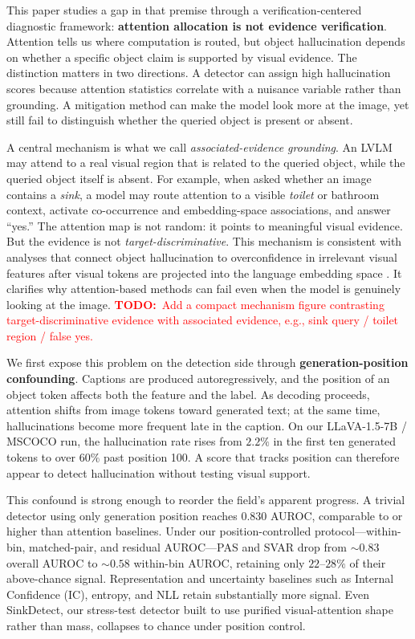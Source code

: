 \documentclass[letterpaper]{article} \usepackage[submission]{aaai2027}  \usepackage[hyphens]{url}  \usepackage{graphicx} \urlstyle{rm} \def\UrlFont{\rm}  \usepackage{natbib}  \usepackage{caption} \frenchspacing
\newcommand{\TODO}[1]{\textcolor{red}{\textbf{TODO:}~#1}}
\begin{document}
This paper studies a gap in that premise through a verification-centered diagnostic framework: \textbf{attention allocation is not evidence verification}. Attention tells us where computation is routed, but object hallucination depends on whether a specific object claim is supported by visual evidence. The distinction matters in two directions. A detector can assign high hallucination scores because attention statistics correlate with a nuisance variable rather than grounding. A mitigation method can make the model look more at the image, yet still fail to distinguish whether the queried object is present or absent.

A central mechanism is what we call \emph{associated-evidence grounding}. An LVLM may attend to a real visual region that is related to the queried object, while the queried object itself is absent. For example, when asked whether an image contains a \emph{sink}, a model may route attention to a visible \emph{toilet} or bathroom context, activate co-occurrence and embedding-space associations, and answer ``yes.'' The attention map is not random: it points to meaningful visual evidence. But the evidence is not \emph{target-discriminative}. This mechanism is consistent with analyses that connect object hallucination to overconfidence in irrelevant visual features after visual tokens are projected into the language embedding space \cite{bai2025adavib}. It clarifies why attention-based methods can fail even when the model is genuinely looking at the image.
\TODO{Add a compact mechanism figure contrasting target-discriminative evidence with associated evidence, e.g., sink query / toilet region / false yes.}

We first expose this problem on the detection side through \textbf{generation-position confounding}. Captions are produced autoregressively, and the position of an object token affects both the feature and the label. As decoding proceeds, attention shifts from image tokens toward generated text; at the same time, hallucinations become more frequent late in the caption. On our LLaVA-1.5-7B / MSCOCO run, the hallucination rate rises from $2.2\%$ in the first ten generated tokens to over $60\%$ past position 100. A score that tracks position can therefore appear to detect hallucination without testing visual support.

This confound is strong enough to reorder the field's apparent progress. A trivial detector using only generation position reaches $0.830$ AUROC, comparable to or higher than attention baselines. Under our position-controlled protocol---within-bin, matched-pair, and residual AUROC---PAS and SVAR drop from $\sim$$0.83$ overall AUROC to $\sim$$0.58$ within-bin AUROC, retaining only $22$--$28\%$ of their above-chance signal. Representation and uncertainty baselines such as Internal Confidence (IC), entropy, and NLL retain substantially more signal. Even SinkDetect, our stress-test detector built to use purified visual-attention shape rather than mass, collapses to chance under position control.
\end{document}
